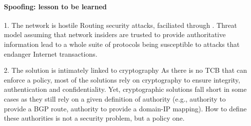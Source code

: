 \paragraph{Spoofing: lesson to be learned}%
\label{par:Spoofing: lesson to be learned}
\begin{parag}{1. The network is hostile}
    Routing security attacks, faciliated through . Threat model assuming that network insiders are trusted to provide authoritative information lead to a whole suite of protocols being susceptible to attacks that endanger Internet transactions.
\end{parag}
\begin{parag}{2. The solution is intimately linked to cryptography}
    As there is no TCB that can enforce a policy, most of the solutions rely on cryptography to ensure integrity, authentication and confidentiality. Yet, cryptographic solutions fall short in some cases as they still rely on a given definition of authority (e.g., authority to provide a BGP route, authority to provide a domain-IP mapping). How to define these authorities is not a security problem, but a policy one.
\end{parag}

